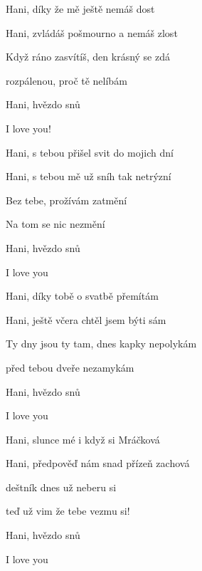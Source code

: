 

\zs
Hani, díky že mě ještě nemáš dost

Hani, zvládáš pošmourno a nemáš zlost

Když ráno zasvítíš, den krásný se zdá

rozpálenou, proč tě nelíbám

Hani, hvězdo snů

I love you!
\ks

\zs
Hani, s tebou přišel svit do mojich dní

Hani, s tebou mě už sníh tak netrýzní

Bez tebe, prožívám zatmění

Na tom se nic nezmění

Hani, hvězdo snů

I love you
\ks

\zs
Hani, díky tobě o svatbě přemítám

Hani, ještě včera chtěl jsem býti sám

Ty dny jsou ty tam, dnes kapky nepolykám

před tebou dveře nezamykám

Hani, hvězdo snů

I love you
\ks

\zs
Hani, slunce mé i když si Mráčková

Hani, předpověď nám snad přízeň zachová

deštník dnes už neberu si

teď už vim že tebe vezmu si!

Hani, hvězdo snů

I love you
\ks

\kp
